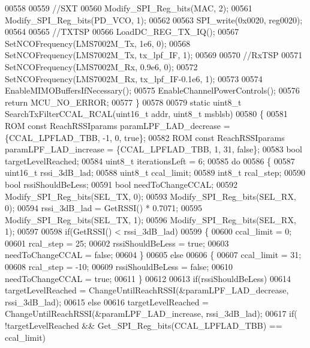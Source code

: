 \begin{DoxyCode}
00558 
00559     \textcolor{comment}{//SXT}
00560     Modify_SPI_Reg_bits(MAC, 2);
00561     Modify_SPI_Reg_bits(PD_VCO, 1);
00562 
00563     SPI_write(0x0020, reg0020);
00564 
00565     \textcolor{comment}{//TXTSP}
00566     LoadDC_REG_TX_IQ();
00567     SetNCOFrequency(LMS7002M_Tx, 1e6, 0);
00568     SetNCOFrequency(LMS7002M_Tx, tx\_lpf\_IF, 1);
00569 
00570     \textcolor{comment}{//RxTSP}
00571     SetNCOFrequency(LMS7002M_Rx, 0.9e6, 0);
00572     SetNCOFrequency(LMS7002M_Rx, tx\_lpf\_IF-0.1e6, 1);
00573 
00574     EnableMIMOBuffersIfNecessary();
00575     EnableChannelPowerControls();
00576     \textcolor{keywordflow}{return} MCU_NO_ERROR;
00577 \}
00578 
00579 \textcolor{keyword}{static} uint8\_t SearchTxFilterCCAL_RCAL(uint16\_t addr, uint8\_t msblsb)
00580 \{
00581     ROM \textcolor{keyword}{const} ReachRSSIparams paramLPF\_LAD\_decrease = \{CCAL_LPFLAD_TBB, -1, 0, \textcolor{keyword}{true}\};
00582     ROM \textcolor{keyword}{const} ReachRSSIparams paramLPF\_LAD\_increase = \{CCAL_LPFLAD_TBB, 1, 31, \textcolor{keyword}{false}\};
00583     \textcolor{keywordtype}{bool} targetLevelReached;
00584     uint8\_t iterationsLeft = 6;
00585     \textcolor{keywordflow}{do}
00586     \{
00587         uint16\_t rssi\_3dB\_lad;
00588         uint8\_t ccal\_limit;
00589         int8\_t rcal\_step;
00590         \textcolor{keywordtype}{bool} rssiShouldBeLess;
00591         \textcolor{keywordtype}{bool} needToChangeCCAL;
00592         Modify_SPI_Reg_bits(SEL_TX, 0);
00593         Modify_SPI_Reg_bits(SEL_RX, 0);
00594         rssi\_3dB\_lad = GetRSSI() * 0.7071;
00595         Modify_SPI_Reg_bits(SEL_TX, 1);
00596         Modify_SPI_Reg_bits(SEL_RX, 1);
00597 
00598         \textcolor{keywordflow}{if}(GetRSSI() < rssi\_3dB\_lad)
00599         \{
00600             ccal\_limit = 0;
00601             rcal\_step = 25;
00602             rssiShouldBeLess = \textcolor{keyword}{true};
00603             needToChangeCCAL = \textcolor{keyword}{false};
00604         \}
00605         \textcolor{keywordflow}{else}
00606         \{
00607             ccal\_limit = 31;
00608             rcal\_step = -10;
00609             rssiShouldBeLess = \textcolor{keyword}{false};
00610             needToChangeCCAL = \textcolor{keyword}{true};
00611         \}
00612 
00613         \textcolor{keywordflow}{if}(rssiShouldBeLess)
00614             targetLevelReached = ChangeUntilReachRSSI(&paramLPF\_LAD\_decrease, rssi\_3dB\_lad);
00615         \textcolor{keywordflow}{else}
00616             targetLevelReached = ChangeUntilReachRSSI(&paramLPF\_LAD\_increase, rssi\_3dB\_lad);
00617         \textcolor{keywordflow}{if}( !targetLevelReached && Get_SPI_Reg_bits(CCAL_LPFLAD_TBB) == ccal\_limit)

\end{DoxyCode}
